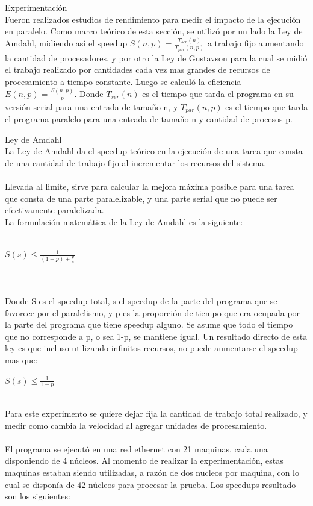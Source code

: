 \begin{section}{Experimentación}
~\\
Fueron realizados estudios de rendimiento para medir el impacto de la ejecución en paralelo. Como marco teórico de esta sección, se utilizó por un lado la Ley de Amdahl, midiendo así el speedup $S(n,p) = \frac{T_{ser}(n) }{ T_{par}(n,p)}$  a trabajo fijo aumentando la cantidad de procesadores, y por otro la Ley de Gustavson para la cual se midió el trabajo realizado por cantidades cada vez mas grandes de recursos de procesamiento a tiempo constante. Luego se calculó la eficiencia $E(n,p) = \frac{S(n,p)}{p}$. Donde $ T_{ser}(n)$  es el tiempo que tarda el programa en su versión serial para una entrada de tamaño n, y $T_{par}(n,p)$  es el tiempo que tarda el programa paralelo para una entrada de tamaño n y cantidad de procesos p.

\begin{subsection}{Ley de Amdahl}
~\\
La Ley de Amdahl da el speedup teórico en la ejecución de una tarea que consta de una cantidad de trabajo fijo al incrementar los recursos del sistema.
~\\
~\\
Llevada al limite, sirve para calcular la mejora máxima posible para una tarea que consta de una parte paralelizable, y una parte serial que no puede ser efectivamente paralelizada.
~\\
La formulación matemática de la Ley de Amdahl es la siguiente:
~\\
~\\
\begin{center}
$S(s) \leq  \frac{1}{(1-p)+\frac{p}{s}}$
\end{center}
~\\
~\\
Donde S es el speedup total, s el speedup de la parte del programa que se favorece por el paralelismo, y p es la proporción de tiempo que era ocupada por la parte del programa que tiene speedup alguno. Se asume que todo el tiempo que no corresponde a p, o sea 1-p, se mantiene igual. Un resultado directo de esta ley es que incluso utilizando infinitos recursos, no puede aumentarse el speedup mas que:
~\\
\begin{center}

$S(s) \leq  \frac{1}{1-p}$
\end{center}

~\\

Para este experimento se quiere dejar fija la cantidad de trabajo total realizado, y medir como cambia la velocidad al agregar unidades de procesamiento. 
~\\
~\\
El programa se ejecutó en una red ethernet con 21 maquinas, cada una disponiendo de 4 núcleos. Al momento de realizar la experimentación, estas maquinas estaban siendo utilizadas, a razón de dos nucleos por maquina, con lo cual se disponía de 42 núcleos para procesar la prueba. Los speedups resultado son los siguientes:
~\\


\end{subsection}
\end{section}
